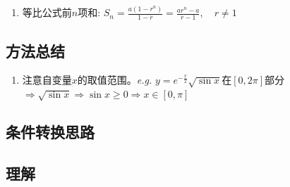 \documentclass[a4paper,12pt]{article}
\begin{document}
    \begin{enumerate}

        \item 等比公式前$n$项和: $S_n = \displaystyle\frac{a(1-r^n)}{1-r} = \displaystyle\frac{ar^n - a}{r - 1}, \quad r \ne 1 $
    \end{enumerate}

    \subsection{方法总结}

    \begin{enumerate}
        \item 注意自变量$x$的取值范围。\emph{e.g.} $y = e^{-\frac{x}{2}}\sqrt {\sin x}$在$[0, 2\pi]$部分$\Rightarrow \sqrt {\sin x} \Rightarrow \sin x \geq 0 \Rightarrow x \in [0, \pi]$

    \end{enumerate}

    \subsection{条件转换思路}

    \begin{enumerate}

    \end{enumerate}

    \subsection{理解}

    \begin{enumerate}
    \end{enumerate}
\end{document}
